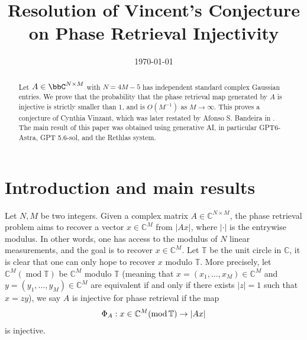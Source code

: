 \documentclass[11pt,reqno]{amsart}
\title{Resolution of Vincent's Conjecture on Phase Retrieval Injectivity}
\author{}
\date{\today}
\begin{document}
\begin{abstract}
    Let $A\in\bbC^{N\times M}$ with $N=4M-5$ has independent standard complex Gaussian entries. We prove that the probability that the phase retrieval map generated by $A$ is injective is strictly smaller than $1$, and is $O(M^{-1})$ as $M\to \infty$. This proves a conjecture of Cynthia Vinzant, which was later restated by Afonso S. Bandeira in \cite{bandeira2026randomstrasse101}. The main result of this paper was obtained using generative AI, in particular GPT6-Astra, GPT 5.6-sol, and the Rethlas system.
\end{abstract}

\maketitle

\setcounter{tocdepth}{1}
\tableofcontents

\section{Introduction and main results}
\label{s:intro}

Let $N,M$ be two integers. Given a complex matrix $A \in \mathbb C^{N\times M}$, the phase retrieval problem aims to recover a vector $x \in \mathbb C^{M}$ from $|Ax|$, where $|\cdot|$ is the entrywise modulus. In other words, one has access to the modulus of $N$ linear measurements, and the goal is to recover $x \in \mathbb C^M$. Let $\mathbb T$ be the unit circle in $\mathbb C$, it is clear that one can only hope to recover $x$ modulo $\mathbb T$. More precisely, let $\mathbb C^M (\operatorname{mod} \mathbb T)$ be $\mathbb C^M$ modulo $\mathbb T$ (meaning that $x=(x_1,\ldots,x_M) \in \mathbb C^M$ and $y=(y_1,\ldots,y_M) \in \mathbb C^M$ are equivalent if and only if there exists $|z|=1$ such that $x=zy$), we say $A$ is injective for phase retrieval if the map
\begin{align}{\label{eq:phase-retrieval-map}}
    \Phi_A: x \in \mathbb C^M (\operatorname{mod} \mathbb T) \to |Ax|
\end{align}
is injective.
\end{document}
